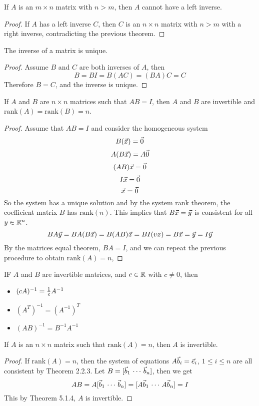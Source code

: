 \documentclass[english,12pt]{article}
\begin{document}
\begin{thrm}
If $A$ is an $m \times n$ matrix with $n > m$, then $A$ cannot have a left inverse.
\begin{proof}
If $A$ has a left inverse $C$, then $C$ is an $n \times n$ matrix with $n > m$ with a right inverse, contradicting the previous theorem.
\end{proof}
\end{thrm}

\begin{thrm}
The inverse of a matrix is unique.
\begin{proof}
Assume $B$ and $C$ are both inverses of $A$, then
\[B = BI = B(AC) = (BA)C = C\]
Therefore $B = C$, and the inverse is unique.
\end{proof}
\end{thrm}

\begin{thrm}
If $A$ and $B$ are $n \times n$ matrices such that $AB = I$, then $A$ and $B$ are invertible and $\text{rank}(A) = \text{rank}(B) = n$.
\begin{proof}
Assume that $AB=I$ and consider the homogeneous system
\[B(\vec{x}) = \vec{0}\]
\[A(B\vec{x}) = A\vec{0}\]
\[(AB)\vec{x} = \vec{0}\]
\[I\vec{x} = \vec{0}\]
\[\vec{x} = \vec{0}\]
So the system has a unique solution and by the system rank theorem, the coefficient matrix $B$ has $\text{rank}(n)$. This implies that $B\vec{x} = \vec{y}$ is consistent for all $y \in {\mathbb{R}}^n$.
\[BA\vec{y} = BA(B\vec{x}) = B(AB)\vec{x} = BI(vx) = B\vec{x} = \vec{y} = I\vec{y}\]
By the matrices equal theorem, $BA = I$, and we can repeat the previous procedure to obtain $\text{rank}(A) = n$,
\end{proof}
\end{thrm}

\begin{thrm}
IF $A$ and $B$ are invertible matrices, and $c \in {\mathbb{R}}$ with $c \neq 0$, then
\begin{itemize}
\item $(cA)^{-1} = \frac{1}{c} A^{-1}$
\item $(A^T)^{-1} = (A^{-1})^T$
\item $(AB)^{-1} = B^{-1}A^{-1}$
\end{itemize}
\end{thrm}

\begin{thrm}
If $A$ is an $n \times n$ matrix such that $\text{rank}(A) = n$, then $A$ is invertible.
\begin{proof}
If $\text{rank}(A) = n$, then the system of equations $A\vec{b}_i = \vec{e}_i$, $1 \leq i \leq n$ are all consistent by Theorem 2.2.3. Let $B = \lbrack \vec{b}_1 \,\cdots\,\vec{b}_n \rbrack$, then we get
\[AB = A\lbrack \vec{b}_1 \,\cdots\,\vec{b}_n \rbrack = \lbrack A\vec{b}_1 \,\cdots\,A\vec{b}_n \rbrack = I\]
This by Theorem 5.1.4, $A$ is invertible.
\end{proof}
\end{thrm}
\end{document}
